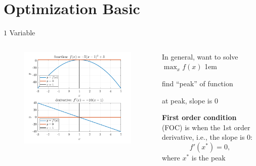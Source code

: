 \documentclass[11pt,aspectratio=43]{beamer}
\let\olditemize=\itemize
\let\endolditemize=\enditemize
\renewenvironment{itemize}{\olditemize \itemsep1em}{\endolditemize}
\theoremstyle{definition}
\begin{document}
\section{Optimization Basic}
\label{sec:Optimization_Basic}

\begin{frame}{$1$ Variable}
\label{slide:_1__Variable}
    \begin{columns}
        \begin{column}{0.6\textwidth}
            \begin{figure}
                \includegraphics[width=\textwidth]{./figures/1Var.png}
            \end{figure}
        \end{column}
        \begin{column}{0.4\textwidth}
            In general, want to solve $\max_{x} f( x )$
            \begin{itemize}
                \item find ``peak'' of function
                \item at peak, slope is $ 0 $
                \item \textbf{First order condition} (FOC) is when the 1st order derivative, i.e., the slope is $ 0 $:
                \begin{equation*}
                   f'( x^{*} ) = 0
                ,\end{equation*}
                where $ x^{*} $ is the peak
            \end{itemize}
        \end{column}
    \end{columns}
\end{frame}
\end{document}
